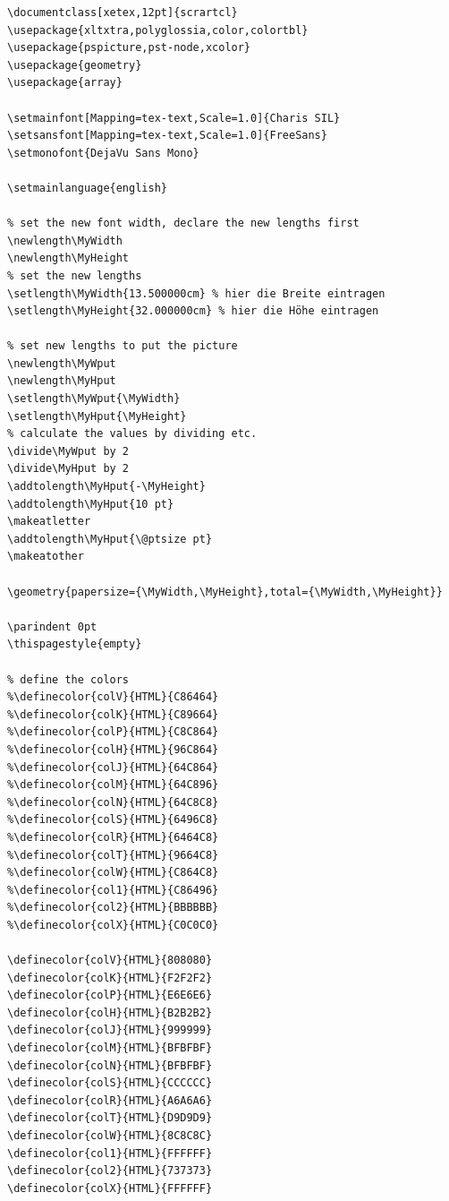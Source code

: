 \begin{verbatim}
\documentclass[xetex,12pt]{scrartcl}
\usepackage{xltxtra,polyglossia,color,colortbl}
\usepackage{pspicture,pst-node,xcolor}
\usepackage{geometry}
\usepackage{array}

\setmainfont[Mapping=tex-text,Scale=1.0]{Charis SIL}
\setsansfont[Mapping=tex-text,Scale=1.0]{FreeSans}
\setmonofont{DejaVu Sans Mono}

\setmainlanguage{english}

% set the new font width, declare the new lengths first
\newlength\MyWidth
\newlength\MyHeight
% set the new lengths
\setlength\MyWidth{13.500000cm} % hier die Breite eintragen
\setlength\MyHeight{32.000000cm} % hier die Höhe eintragen

% set new lengths to put the picture
\newlength\MyWput
\newlength\MyHput
\setlength\MyWput{\MyWidth}
\setlength\MyHput{\MyHeight}
% calculate the values by dividing etc.
\divide\MyWput by 2
\divide\MyHput by 2
\addtolength\MyHput{-\MyHeight}
\addtolength\MyHput{10 pt}
\makeatletter
\addtolength\MyHput{\@ptsize pt}
\makeatother

\geometry{papersize={\MyWidth,\MyHeight},total={\MyWidth,\MyHeight}}

\parindent 0pt
\thispagestyle{empty}

% define the colors
%\definecolor{colV}{HTML}{C86464} 
%\definecolor{colK}{HTML}{C89664} 
%\definecolor{colP}{HTML}{C8C864} 
%\definecolor{colH}{HTML}{96C864} 
%\definecolor{colJ}{HTML}{64C864} 
%\definecolor{colM}{HTML}{64C896} 
%\definecolor{colN}{HTML}{64C8C8} 
%\definecolor{colS}{HTML}{6496C8} 
%\definecolor{colR}{HTML}{6464C8} 
%\definecolor{colT}{HTML}{9664C8} 
%\definecolor{colW}{HTML}{C864C8} 
%\definecolor{col1}{HTML}{C86496} 
%\definecolor{col2}{HTML}{BBBBBB}
%\definecolor{colX}{HTML}{C0C0C0}

\definecolor{colV}{HTML}{808080} 
\definecolor{colK}{HTML}{F2F2F2} 
\definecolor{colP}{HTML}{E6E6E6} 
\definecolor{colH}{HTML}{B2B2B2} 
\definecolor{colJ}{HTML}{999999} 
\definecolor{colM}{HTML}{BFBFBF} 
\definecolor{colN}{HTML}{BFBFBF} 
\definecolor{colS}{HTML}{CCCCCC} 
\definecolor{colR}{HTML}{A6A6A6} 
\definecolor{colT}{HTML}{D9D9D9} 
\definecolor{colW}{HTML}{8C8C8C} 
\definecolor{col1}{HTML}{FFFFFF} 
\definecolor{col2}{HTML}{737373}
\definecolor{colX}{HTML}{FFFFFF}


\end{verbatim}

